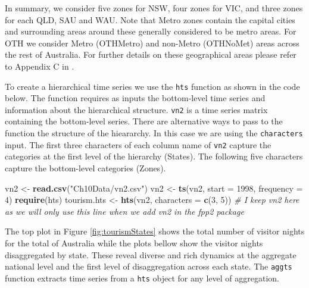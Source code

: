 \documentclass[]{book}
\newenvironment{Shaded}{\begin{snugshade}}{\end{snugshade}}
\newcommand{\CommentTok}[1]{\textcolor[rgb]{0.56,0.35,0.01}{\textit{#1}}}
\newcommand{\DataTypeTok}[1]{\textcolor[rgb]{0.13,0.29,0.53}{#1}}
\newcommand{\DecValTok}[1]{\textcolor[rgb]{0.00,0.00,0.81}{#1}}
\newcommand{\KeywordTok}[1]{\textcolor[rgb]{0.13,0.29,0.53}{\textbf{#1}}}
\newcommand{\NormalTok}[1]{#1}
\newcommand{\StringTok}[1]{\textcolor[rgb]{0.31,0.60,0.02}{#1}}
\begin{document}
In summary, we consider five zones for NSW, four zones for VIC, and three zones for each QLD, SAU and WAU. Note that Metro zones contain the capital cities and surrounding areas around these generally considered to be metro areas. For OTH we consider Metro (OTHMetro) and non-Metro (OTHNoMet) areas across the rest of Australia. For further details on these geographical areas please refer to Appendix C in \citet{Mint}.

To create a hierarchical time series we use the \texttt{hts} function as shown in the code below. The function requires as inputs the bottom-level time series and information about the hierarchical structure. \texttt{vn2} is a time series matrix containing the bottom-level series. There are alternative ways to pass to the function the structure of the hieararchy. In this case we are using the \texttt{characters} input. The first three characters of each column name of \texttt{vn2} capture the categories at the first level of the hierarchy (States). The following five characters capture the bottom-level categories (Zones).

\begin{Shaded}
\begin{Highlighting}[]
\NormalTok{vn2 <-}\StringTok{ }\KeywordTok{read.csv}\NormalTok{(}\StringTok{"Ch10Data/vn2.csv"}\NormalTok{) }
\NormalTok{vn2 <-}\StringTok{ }\KeywordTok{ts}\NormalTok{(vn2, }\DataTypeTok{start =} \DecValTok{1998}\NormalTok{, }\DataTypeTok{frequency =} \DecValTok{4}\NormalTok{)}
\KeywordTok{require}\NormalTok{(hts)}
\NormalTok{tourism.hts <-}\StringTok{ }\KeywordTok{hts}\NormalTok{(vn2, }\DataTypeTok{characters =} \KeywordTok{c}\NormalTok{(}\DecValTok{3}\NormalTok{, }\DecValTok{5}\NormalTok{)) }
\CommentTok{# I keep vn2 here as we will only use this line when we add vn2 in the fpp2 package}
\end{Highlighting}
\end{Shaded}

The top plot in Figure \ref{fig:tourismStates} shows the total number of visitor nights for the total of Australia while the plots bellow show the visitor nights disaggregated by state. These reveal diverse and rich dynamics at the aggregate national level and the first level of disaggregation across each state. The \texttt{aggts} function extracts time series from a \texttt{hts} object for any level of aggregation.
\end{document}
